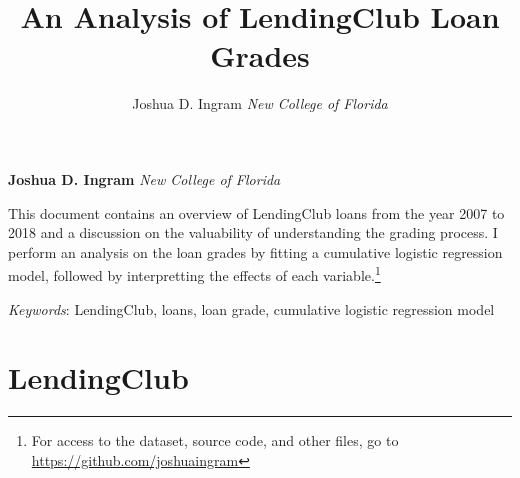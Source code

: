 \documentclass[11pt,]{article}
\title{An Analysis of LendingClub Loan Grades  }
\author{\Large Joshua D. Ingram\vspace{0.05in} \newline\normalsize\emph{New College of Florida}  }
\date{}
\newcommand*{\authorfont}{\fontfamily{phv}\selectfont}
\renewenvironment{abstract}
 {{%
    \setlength{\leftmargin}{0mm}
    \setlength{\rightmargin}{\leftmargin}%
  }%
  \relax}
 {\endlist}
\begin{document}
	
%

{%
\setlength{\parindent}{0pt}
\thispagestyle{plain}
{\fontsize{18}{20}\selectfont\raggedright 
\maketitle  %

}

{
   \vskip 13.5pt\relax \normalsize\fontsize{11}{12} 
\textbf{\authorfont Joshua D. Ingram} \hskip 15pt \emph{\small New College of Florida}   

}

}








\begin{abstract}

    \hbox{\vrule height .2pt width 39.14pc}

    \vskip 8.5pt %

\noindent This document contains an overview of LendingClub loans from the year
2007 to 2018 and a discussion on the valuability of understanding the
grading process. I perform an analysis on the loan grades by fitting a
cumulative logistic regression model, followed by interpretting the
effects of each variable.\footnote{For access to the dataset, source
  code, and other files, go to \url{https://github.com/joshuaingram}}


\vskip 8.5pt \noindent \emph{Keywords}: LendingClub, loans, loan grade, cumulative logistic regression model \par

    \hbox{\vrule height .2pt width 39.14pc}



\end{abstract}


\vskip -8.5pt



\noindent  

\hypertarget{lendingclub}{%
\section{LendingClub}\label{lendingclub}}
\end{document}
